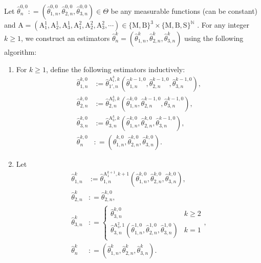 \documentclass[a4paper,11pt]{jsarticle}
\begin{document}
\color{black} Let $ \hat{\theta}^{0,0}_n : =  (\hat{\theta}^{0,0} _{1,n} ,\hat{\theta}^{0,0} _{2,n},\hat{\theta}^{0,0} _{3,n} )  \in \Theta$ be any measurable functions (can be constant) and $\text{A} = (\text{A}_1^{1} ,\text{A}_2^{1},\text{A}_3^{1} ,\text{A}_1^{2} ,\text{A}_2^{2} ,\text{A}_3^{2} ,\cdots) \in \{\text{M},\text{B}\}^3 \times \{\text{M},\text{B},\text{S}\}^{\mathbb{N}} $ .
For any integer $k \geq 1$, we construct an estimators $\hat{\theta}^{k}_n = (\hat{\theta}_{1,n}^{k}, \hat{\theta}_{2,n}^{k}, \hat{\theta}_{3,n}^{k})$ using the following algorithm:
\begin{enumerate}
    \item For $k \geq 1$, define the following estimators inductively:\begin{align}
         \hat{\theta}^{k,0}_{1,n} &:= \hat{\theta}^{\text{A}_{1}^{k},k }_{1',n}(\hat{\theta}^{k- 1,0}_{1,n} ,\hat{\theta}^{k- 1,0}_{2,n},\hat{\theta}^{k- 1,0}_{3,n} ), \\     \hat{\theta}^{k,0}_{2,n} &:= \hat{\theta}^{\text{A}_{2}^{k},k }_{2,n}(\hat{\theta}^{k,0}_{1,n},\hat{\theta}^{k- 1,0}_{2,n} ,\hat{\theta}^{k- 1,0}_{3,n} ) ,\\    \hat{\theta}^{k,0}_{3,n} &:= \hat{\theta}^{\text{A}_{3}^{k},k }_{3,n}(\hat{\theta}^{k,0}_{1,n},\hat{\theta}^{k,0}_{2,n},\hat{\theta}^{k- 1,0}_{3,n} ), \\ \hat{\theta}^{k,0}_n &: = (   \hat{\theta}^{k,0}_{1,n},\hat{\theta}^{k,0}_{2,n},\hat{\theta}^{k,0}_{3,n} ).
    \end{align}
    \item Let\begin{align}
    \hat{\theta}_{1,n}  ^{k} &:= \hat{\theta}_ {1,n} ^{\text{A}_1^{k +1},k+1}(\hat{\theta}_{1,n} ^{k,0},\hat{\theta}_{2,n} ^{k,0},\hat{\theta}_{3,n} ^{k,0}),\\ \hat{\theta}_{2,n}  ^{k} &: = \hat{\theta}^{k,0}_{2,n} , \\ \hat{\theta}_{3,n} ^{k} &: = \begin{cases}
        \hat{\theta}_{3,n} ^{k,0}  & k \geq 2 \\ \hat{\theta}_{3,n} ^{\text{A}_3^{2},1 }(\hat{\theta}_{1,n} ^{1,0},\hat{\theta}_{2,n} ^{1,0},\hat{\theta}_{3,n} ^{1,0}) & k =1
    \end{cases},\\ \hat{\theta}^{k}_n  &: = (\hat{\theta}^{k} _{1,n},\hat{\theta}^{k} _{2,n},\hat{\theta}^{k} _{3,n} ).
\end{align}
\end{enumerate}
\end{document}
